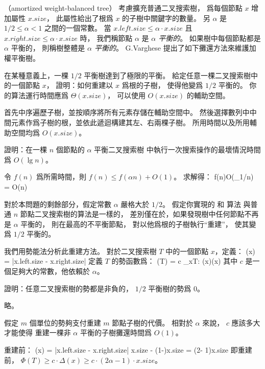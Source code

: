 \startPROBLEM
（amortized weight-balanced tree）
考慮擴充普通二叉搜索樹，
爲每個節點 $x$ 增加屬性 $x.size$，
此屬性給出了根爲 $x$ 的子樹中關鍵字的數量。
另 $\alpha$ 是 $1/2\le \alpha < 1$ 之間的一個常數。
當 $x.left.size\le \alpha\cdot x.size$ 且 $x.right.size\le \alpha\cdot x.size$ 時，
我們稱節點 $\alpha$ 是 \emph{$\alpha$ 平衡的}。
如果樹中每個節點都是 $\alpha$ 平衡的，
則稱樹整體是 \emph{$\alpha$ 平衡的}。
 G.Varghese 提出了如下攤還方法來維護加權平衡樹。

\startigBase[a]\startitem
在某種意義上，一棵 $1/2$ 平衡樹達到了極限的平衡。
給定任意一棵二叉搜索樹中的一個節點 $x$，
證明：如何重建以 $x$ 爲根的子樹，
使得他變爲 $1/2$ 平衡的。
你的算法運行時間應爲 $\Theta(x.size)$，
可以使用 $O(x.size)$ 的輔助空間。
\stopitem\stopigBase

\startANSWER
首先中序遍歷子樹，並按順序將所有元素存儲在輔助空間中。
然後選擇數列中中間元素作爲子樹的根，並依此遞迴構建其左、右兩棵子樹。
所用時間以及所用輔助空間均爲 $O(x.size)$。
\stopANSWER

\startigBase[continue]\startitem
證明：在一棵 $n$ 個節點的 $\alpha$ 平衡二叉搜索樹
中執行一次搜索操作的最壞情況時間爲 $O(\lg n)$。
\stopitem\stopigBase

\startANSWER
令 $f(n)$ 爲所需時間，則 $f(n)\le f(\alpha n) + O(1)$。
求解得：
\startformula
f(n)\in O(\lg_{1/\alpha}n) = O(\lg n)
\stopformula
\stopANSWER

對於本問題的剩餘部分，假定常數 $\alpha$ 嚴格大於 $1/2$。
假定你實現的  和  算法
與普通 $n$ 節點二叉搜索樹的算法是一樣的，
差別僅在於，如果發現樹中任何節點不再是 $\alpha$ 平衡的，
則在最高的不平衡節點，
對以他爲根的子樹執行“重建”，
使其變爲 $1/2$ 平衡的。

我們用勢能法分析此重建方法。
對於二叉搜索樹 $T$ 中的一個節點 $x$，定義：
\startformula
\Delta(x) = |x.left.size - x.right.size|
\stopformula
定義 $T$ 的勢函數爲：
\startformula
\Phi(T) = c \sum_{x\in T: \Delta(x)}\Delta(x)
\stopformula
其中 $c$ 是一個足夠大的常數，他依賴於 $\alpha$。

\startigBase[continue]\startitem
證明：任意二叉搜索樹的勢都是非負的， $1/2$ 平衡樹的勢爲 $0$。
\stopitem\stopigBase

\startANSWER
略。
\stopANSWER

\startigBase[continue]\startitem
假定 $m$ 個單位的勢夠支付重建 $m$ 節點子樹的代價。
相對於 $\alpha$ 來說， $c$ 應該多大才能使得
重建一棵非 $\alpha$ 平衡的子樹攤還時間爲 $O(1)$。
\stopitem\stopigBase

\startANSWER
重建前：
\startsplitformula\startmathalignment
\NC \Delta(x)
   \NC = |x.left.size - x.right.size| \NR
\NC\NC \ge \alpha \cdot x.size - (1-\alpha)\cdot x.size \NR
\NC\NC = (2\alpha - 1)\cdot x.size \NR
\stopmathalignment\stopsplitformula
即重建前， $\Phi(T) \ge c \cdot \Delta(x) \ge c\cdot (2\alpha - 1)\cdot x.size$。

